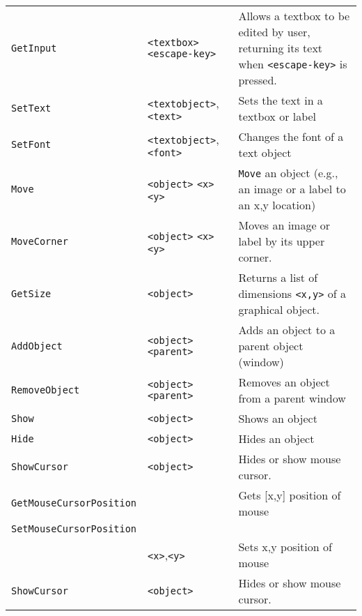 \begin{longtable}{p{3cm}p{3cm}p{6cm}}
\verb+GetInput+ &\verb+<textbox>+ \verb+<escape-key>+& Allows a textbox to be edited by user, returning its text when \verb+<escape-key>+ is pressed.\\ 
\verb+SetText+ &\verb+<textobject>+, \verb+<text>+ &Sets the text in a textbox or label\\ 
\verb+SetFont+ &\verb+<textobject>+, \verb+<font>+ &Changes the font of a text object \\ 
\verb+Move+ &\verb+<object>+ \verb+<x>+ \verb+<y>+& \verb+Move+ an object (e.g., an image or a label to an x,y location) \\ 
\verb+MoveCorner+ &\verb+<object>+ \verb+<x>+ \verb+<y>+& Moves an image or label by its upper corner.\\ 
\verb+GetSize+ &\verb+<object>+ &Returns a list of dimensions \verb+<x,y>+ of a graphical object.\\ 
\verb+AddObject+ &\verb+<object>+ \verb+<parent>+ & Adds an object to a parent object (window)\\ 
\verb+RemoveObject+ &\verb+<object>+ \verb+<parent>+ &Removes an object from a parent window\\ 
\verb+Show+ &\verb+<object>+ &Shows an object\\ 
\verb+Hide+ &\verb+<object>+ &Hides an object\\ 
\verb+ShowCursor+ &\verb+<object>+ &Hides or show mouse cursor.\\
\verb+GetMouseCursorPosition+ & &Gets [x,y] position of mouse\\
\verb+SetMouseCursorPosition+ \\
&\verb+<x>+,\verb+<y>+ &Sets x,y position of mouse\\
\verb+ShowCursor+ &\verb+<object>+ &Hides or show mouse cursor.\\


\end{longtable}
